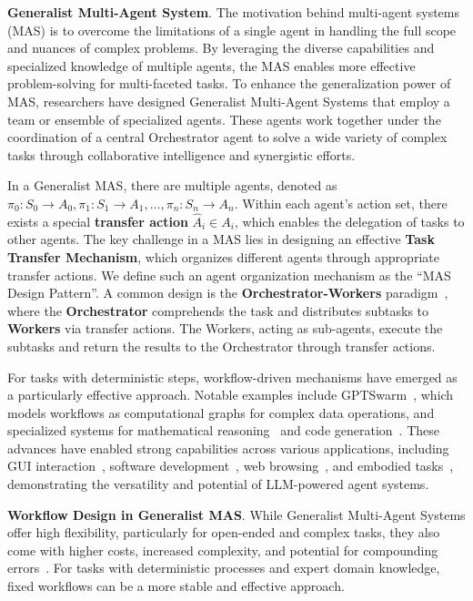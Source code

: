 \textbf{Generalist Multi-Agent System}. The motivation behind multi-agent systems (MAS) is to overcome the limitations of a single agent in handling the full scope and nuances of complex problems. By leveraging the diverse capabilities and specialized knowledge of multiple agents, the MAS enables more effective problem-solving for multi-faceted tasks. To enhance the generalization power of MAS, researchers have designed Generalist Multi-Agent Systems that employ a team or ensemble of specialized agents. These agents work together under the coordination of a central Orchestrator agent to solve a wide variety of complex tasks through collaborative intelligence and synergistic efforts.

In a Generalist MAS, there are multiple agents, denoted as $\pi_0: S_0 \rightarrow A_0, \pi_1: S_1 \rightarrow A_1, \dots, \pi_n: S_n \rightarrow A_n$. Within each agent's action set, there exists a special \textbf{transfer action} $\hat{A}_i \in A_i$, which enables the delegation of tasks to other agents. The key challenge in a MAS lies in designing an effective \textbf{Task Transfer Mechanism}, which organizes different agents through appropriate transfer actions. We define such an agent organization mechanism as the ``MAS Design Pattern''. A common design is the \textbf{Orchestrator-Workers} paradigm~\cite{Magentic, anthropic2023effectiveagents}, where the \textbf{Orchestrator} comprehends the task and distributes subtasks to \textbf{Workers} via transfer actions. The Workers, acting as sub-agents, execute the subtasks and return the results to the Orchestrator through transfer actions.

For tasks with deterministic steps, workflow-driven mechanisms have emerged as a particularly effective approach. Notable examples include GPTSwarm~\cite{zhugegptswarm}, which models workflows as computational graphs for complex data operations, and specialized systems for mathematical reasoning~\cite{self_consistency} and code generation~\cite{plansearch}. These advances have enabled strong capabilities across various applications, including GUI interaction~\cite{cogagent, xu2024aguvis}, software development~\cite{openhands, yang2024sweagent}, web browsing~\cite{workarena2024,song2024browsingapibasedwebagents}, and embodied tasks~\cite{li2024embodied}, demonstrating the versatility and potential of LLM-powered agent systems.

\textbf{Workflow Design in Generalist MAS}. While Generalist Multi-Agent Systems offer high flexibility, particularly for open-ended and complex tasks, they also come with higher costs, increased complexity, and potential for compounding errors~\cite{anthropic2023effectiveagents}. For tasks with deterministic processes and expert domain knowledge, fixed workflows can be a more stable and effective approach.

